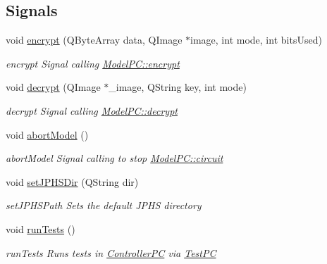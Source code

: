 \subsection*{Signals}
\begin{DoxyCompactItemize}
\item 
void \hyperlink{class_view_p_c_a27ecfb84029d42029631b776a02ff5d8}{encrypt} (Q\-Byte\-Array data, Q\-Image $\ast$image, int mode, int bits\-Used)
\begin{DoxyCompactList}\small\item\em encrypt Signal calling \hyperlink{class_model_p_c_a6f191f62d4635d0d3555fcc0be298794}{Model\-P\-C\-::encrypt} \end{DoxyCompactList}\item 
void \hyperlink{class_view_p_c_a365df051360d557c7221474ad856e0af}{decrypt} (Q\-Image $\ast$\-\_\-image, Q\-String key, int mode)
\begin{DoxyCompactList}\small\item\em decrypt Signal calling \hyperlink{class_model_p_c_a5995215a34a1e1f504035715a8013809}{Model\-P\-C\-::decrypt} \end{DoxyCompactList}\item 
void \hyperlink{class_view_p_c_aa652102ce6b5757b8eef830409c8cabf}{abort\-Model} ()
\begin{DoxyCompactList}\small\item\em abort\-Model Signal calling to stop \hyperlink{class_model_p_c_a1d0091062a0c836b283ec2f67411623b}{Model\-P\-C\-::circuit} \end{DoxyCompactList}\item 
void \hyperlink{class_view_p_c_ae81085836c0c01bc9556a5b27eb8d19c}{set\-J\-P\-H\-S\-Dir} (Q\-String dir)
\begin{DoxyCompactList}\small\item\em set\-J\-P\-H\-S\-Path Sets the default J\-P\-H\-S directory \end{DoxyCompactList}\item 
void \hyperlink{class_view_p_c_a96a6c95728bf20c64d2a8fe978495395}{run\-Tests} ()
\begin{DoxyCompactList}\small\item\em run\-Tests Runs tests in \hyperlink{class_controller_p_c}{Controller\-P\-C} via \hyperlink{class_test_p_c}{Test\-P\-C} \end{DoxyCompactList}\end{DoxyCompactItemize}
